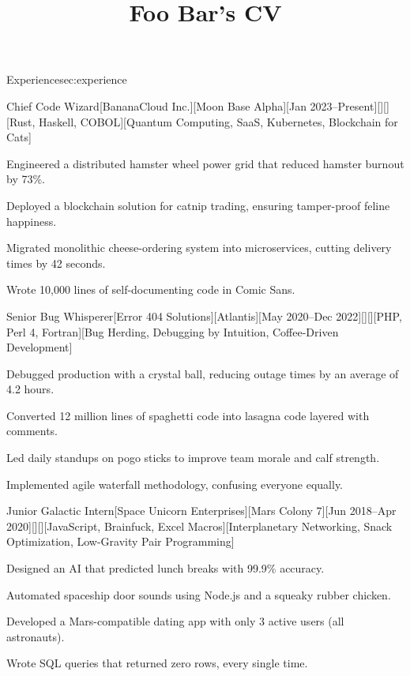 \documentclass[11pt, letterpaper, extended ]{i-am-developer}
\title{Foo Bar's CV}
\begin{document}
\nameSection{\lipsum[1]}

\begin{devCVSection}{Experience}{sec:experience}
  \begin{devRole}{Chief Code Wizard}[BananaCloud Inc.][Moon Base
    Alpha][Jan 2023--Present][\faMagic][\faMapMarker][Rust, Haskell,
    COBOL][Quantum Computing, SaaS, Kubernetes, Blockchain for Cats]
    \begin{devItemize}
    \item Engineered a distributed hamster wheel power grid that
      reduced hamster burnout by 73\%.
    \item Deployed a blockchain solution for catnip trading, ensuring
      tamper-proof feline happiness.
    \item Migrated monolithic cheese-ordering system into
      microservices, cutting delivery times by 42 seconds.
    \item Wrote 10,000 lines of self-documenting code in Comic Sans.
    \end{devItemize}
  \end{devRole}

  \begin{devRole}{Senior Bug Whisperer}[Error 404
    Solutions][Atlantis][May 2020--Dec
    2022][\faBug][\faMapMarker][PHP, Perl 4, Fortran][Bug Herding,
    Debugging by Intuition, Coffee-Driven Development]
    \begin{devItemize}
    \item Debugged production with a crystal ball, reducing outage
      times by an average of 4.2 hours.
    \item Converted 12 million lines of spaghetti code into lasagna
      code layered with comments.
    \item Led daily standups on pogo sticks to improve team morale
      and calf strength.
    \item Implemented agile waterfall methodology, confusing everyone equally.
    \end{devItemize}
  \end{devRole}

  \begin{devRole}{Junior Galactic Intern}[Space Unicorn
    Enterprises][Mars Colony 7][Jun 2018--Apr
    2020][\faRocket][\faMapMarker][JavaScript, Brainfuck, Excel
    Macros][Interplanetary Networking, Snack Optimization,
    Low-Gravity Pair Programming]
    \begin{devItemize}
    \item Designed an AI that predicted lunch breaks with 99.9\% accuracy.
    \item Automated spaceship door sounds using Node.js and a squeaky
      rubber chicken.
    \item Developed a Mars-compatible dating app with only 3 active
      users (all astronauts).
    \item Wrote SQL queries that returned zero rows, every single time.
    \end{devItemize}
  \end{devRole}


\end{devCVSection}
\end{document}
